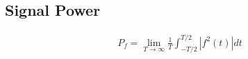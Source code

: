\documentclass[a4paper]{amsart}
\begin{document}
\subsection{Signal Power}
\begin{eqnarray}
	P_f=\lim_{T\rightarrow\infty}\frac{1}{T}\int_{-T/2}^{T/2}|f^2(t)|dt	
\end{eqnarray}
\begin{comment}
	

\section{Some useful signals}
\subsection{Unit Step Function $u(t)$}
\begin{eqnarray}
	u(t)=
	\begin{cases}
		1 & \mbox{if }\geq0 \\
		0 & \mbox{else }
	\end{cases}
\end{eqnarray}
\subsection{Unit Impulse Function $\delta(t)$}
\begin{eqnarray}
	\delta(t)=
	\begin{cases}
		1 & \mbox{if }t=0 \\
		0 & \mbox{else }
	\end{cases}
\end{eqnarray}


\subsection{Exponential Function}
\begin{eqnarray}
	e^{st}=e^{(\sigma+j\omega)t}=e^{\omega t}(\cos{(\omega t)}+\sin{(\omega t)})
\end{eqnarray}

\begin{itemize}
	\item $s=0: e^{0t}=1$: constant
	\item $s=\sigma\in\mathbb R: e^{\sigma t}$: monotonic exponential
	\item $s=j\omega: e^{j\omega t}$: pure sinusoid
	\item $s=\sigma + j\omega: e^{(\sigma+j\omega)t}$: vorging sinusoid
\end{itemize}


\end{comment}
\end{document}
